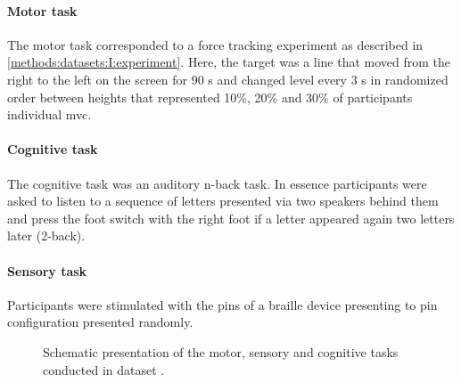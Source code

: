 \paragraph{Motor task} 
The motor task corresponded to a force tracking experiment as described in \autoref{methods:datasets:I:experiment}. Here, the target was a line that moved from the right to the left on the screen for 90 s and changed level every 3 s in randomized order between heights that represented 10\%, 20\% and 30\% of participants individual \gls{mvc}.
\paragraph{Cognitive task}
The cognitive task was an auditory n-back task. In essence participants were asked to listen to a sequence of letters presented via two speakers behind them and press the foot switch with the right foot if a letter appeared again two letters later (2-back).
\paragraph{Sensory task}
Participants were stimulated with the pins of a braille device presenting to pin configuration presented randomly. 

\begin{figure}[h]
\begin{center}

\caption[Schematic presentation of the motor, sensory and cognitive tasks conducted in dataset .]{Schematic presentation of the motor, sensory and cognitive tasks conducted in dataset .}
\label{fig:DSII_exp3}
\end{center}
\end{figure}


